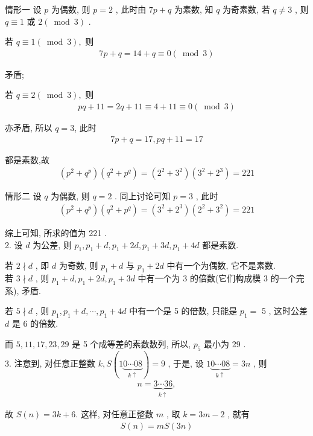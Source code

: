 情形一 设 $p$ 为偶数, 则 $p=2$ , 此时由 $7 p+q$ 为素数, 知 $q$ 为奇素数, 若 $q \neq 3$ , 则 $q \equiv 1$ 或 $2(\bmod 3)$ .

若 $q \equiv 1(\bmod 3) , $ 则
\begin{align*}
	7 p+q=14+q \equiv 0(\bmod 3)
\end{align*}

矛盾;

若 $q \equiv 2(\bmod 3) , $ 则
\begin{align*}
	p q+11=2 q+11 \equiv 4+11 \equiv 0(\bmod 3)
\end{align*}

亦矛盾, 所以 $q=3$, 此时
\begin{align*}
	7 p+q=17, p q+11=17
\end{align*}

都是素数,故
\begin{align*}
	\left(p^{2}+q^{p}\right)\left(q^{2}+p^{q}\right)=\left(2^{2}+3^{2}\right)\left(3^{2}+2^{3}\right)=221
\end{align*}

情形二 设 $q$ 为偶数, 则 $q=2$ . 同上讨论可知 $p=3$ , 此时
\begin{align*}
	\left(p^{2}+q^{p}\right)\left(q^{2}+p^{q}\right)=\left(3^{2}+2^{3}\right)\left(2^{2}+3^{2}\right)=221
\end{align*}

综上可知, 所求的值为 221 .\\
2. 设 $d$ 为公差, 则 $p_{1}, p_{1}+d, p_{1}+2 d, p_{1}+3 d, p_{1}+4 d$ 都是素数.

若 $2 \nmid d$ , 即 $d$ 为奇数, 则 $p_{1}+d$ 与 $p_{1}+2 d$ 中有一个为偶数, 它不是素数. \\
若 $3 \nmid d$ , 则 $p_{1}+d ,  p_{1}+2 d ,  p_{1}+3 d$ 中有一个为 3 的倍数(它们构成模 3 的一个完系), 矛盾.

若 $5 \nmid d$ , 则 $p_{1}, p_{1}+d, \cdots, p_{1}+4 d$ 中有一个是 5 的倍数, 只能是 $p_{1}=$ 5 , 这时公差 $d$ 是 6 的倍数.

而 $5,11,17,23,29$ 是 5 个成等差的素数数列, 所以,  $p_{5}$ 最小为 29 . \\
3. 注意到, 对任意正整数 $k, S(1 \underbrace{0 \cdots 08}_{k \uparrow})=9$ , 于是, 设 $1 \underbrace{0 \cdots 08}_{k \uparrow}=3 n$ , 则
\begin{align*}
	n=\underbrace{3 \cdots 36}_{k \uparrow},
\end{align*}

故 $S(n)=3 k+6$. 这样, 对任意正整数 $m$ , 取 $k=3 m-2$ , 就有
\begin{align*}
	S(n)=m S(3 n)
\end{align*}

